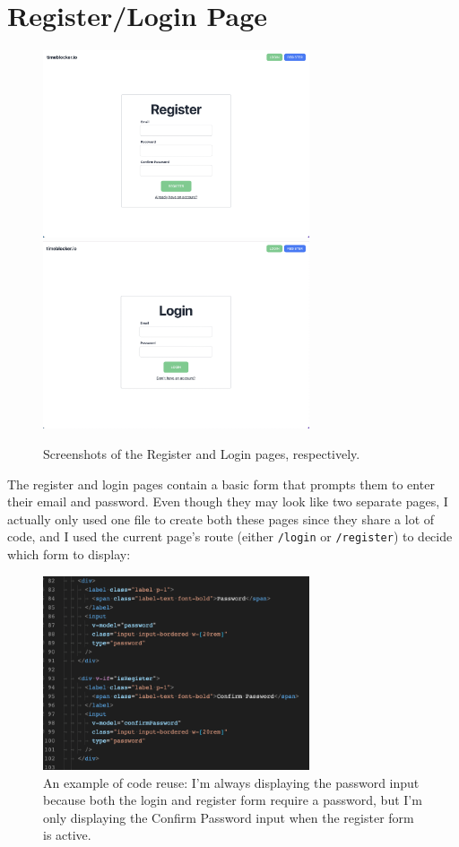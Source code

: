 \documentclass[notitlepage, 12pt]{report}
\newcommand{\code}[1]{\texttt{#1}}
\begin{document}
\newpage
\section*{Register/Login Page}

\begin{figure}[H]
	\centering
	\caption{Screenshots of the Register and Login pages, respectively.}
	\includegraphics[width=0.7\textwidth]{frontend-register-page.png}
	\includegraphics[width=0.7\textwidth]{frontend-login-page.png}
\end{figure}

The register and login pages contain a basic form that prompts them to enter their email and password. Even though they may look like two separate pages, I actually only used one file to create both these pages since they share a lot of code, and I used the current page's route (either \code{/login} or \code{/register}) to decide which form to display:

\begin{figure}[H]
	\centering
	\caption{An example of code reuse: I'm always displaying the password input because both the login and register form require a password, but I'm only displaying the Confirm Password input when the register form is active.}
	\includegraphics[width=0.7\textwidth]{passwords.png}
\end{figure}
\end{document}
